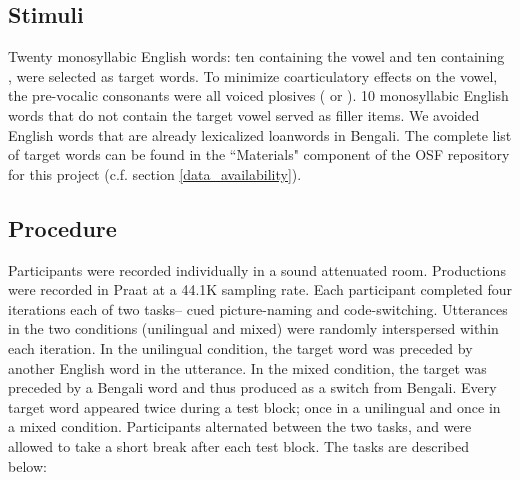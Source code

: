\documentclass[12 pt]{article}
\newcommand{\nt}[1]{\textipa{[#1]}} %
\begin{document}
\subsection{Stimuli}
Twenty monosyllabic English words: ten containing the vowel \nt{2} and ten containing \nt{\ae}, were selected as target words. To minimize coarticulatory effects on the vowel, the pre-vocalic consonants were all voiced plosives (\nt{b} or \nt{d}). 10 monosyllabic English words that do not contain the target vowel served as filler items. We avoided English words that are already lexicalized loanwords in Bengali. The complete list of target words can be found in the ``Materials" component of the OSF repository for this project (c.f. section \ref{data_availability}).



\subsection{Procedure} \label{procedure}
Participants were recorded individually in a sound attenuated room. %
Productions were recorded in Praat \citep{boersma2016praat} at a 44.1K sampling rate. Each participant completed four iterations each of two tasks-- cued picture-naming and code-switching. Utterances in the two conditions (unilingual and mixed) were randomly interspersed within each iteration. In the unilingual condition, the target word was preceded by another English word in the utterance. In the mixed condition, the target was preceded by a Bengali word and thus produced as a switch from Bengali. Every target word appeared twice during a test block; once in a unilingual and once in a mixed condition. Participants alternated between the two tasks, and were allowed to take a short break after each test block. The tasks are described below:
\end{document}
